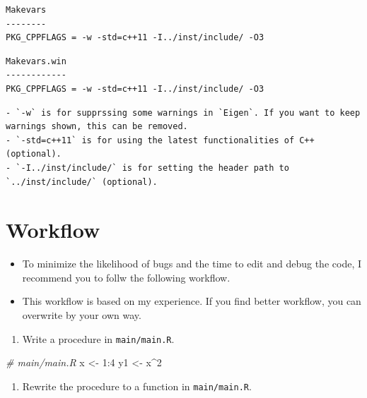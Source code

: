 \documentclass[
]{book}
\newenvironment{Shaded}{\begin{snugshade}}{\end{snugshade}}
\newcommand{\CommentTok}[1]{\textcolor[rgb]{0.56,0.35,0.01}{\textit{#1}}}
\newcommand{\DecValTok}[1]{\textcolor[rgb]{0.00,0.00,0.81}{#1}}
\newcommand{\NormalTok}[1]{#1}
\newcommand{\OtherTok}[1]{\textcolor[rgb]{0.56,0.35,0.01}{#1}}
\newcommand{\SpecialCharTok}[1]{\textcolor[rgb]{0.00,0.00,0.00}{#1}}
\providecommand{\tightlist}{%
  \setlength{\itemsep}{0pt}\setlength{\parskip}{0pt}}
\begin{document}
\begin{verbatim}
Makevars
--------
PKG_CPPFLAGS = -w -std=c++11 -I../inst/include/ -O3
\end{verbatim}

\begin{verbatim}
Makevars.win
------------
PKG_CPPFLAGS = -w -std=c++11 -I../inst/include/ -O3
\end{verbatim}

\begin{verbatim}
- `-w` is for supprssing some warnings in `Eigen`. If you want to keep warnings shown, this can be removed.
- `-std=c++11` is for using the latest functionalities of C++ (optional).
- `-I../inst/include/` is for setting the header path to `../inst/include/` (optional).
\end{verbatim}

\hypertarget{workflow}{%
\section{Workflow}\label{workflow}}

\begin{itemize}
\tightlist
\item
  To minimize the likelihood of bugs and the time to edit and debug the code, I recommend you to follw the following workflow.
\item
  This workflow is based on my experience. If you find better workflow, you can overwrite by your own way.
\end{itemize}

\begin{enumerate}
\def\labelenumi{\arabic{enumi}.}
\tightlist
\item
  Write a procedure in \texttt{main/main.R}.
\end{enumerate}

\begin{Shaded}
\begin{Highlighting}[]
\CommentTok{\# main/main.R}
\NormalTok{x }\OtherTok{\textless{}{-}} \DecValTok{1}\SpecialCharTok{:}\DecValTok{4}
\NormalTok{y1 }\OtherTok{\textless{}{-}}\NormalTok{ x}\SpecialCharTok{\^{}}\DecValTok{2}
\end{Highlighting}
\end{Shaded}

\begin{enumerate}
\def\labelenumi{\arabic{enumi}.}
\setcounter{enumi}{1}
\tightlist
\item
  Rewrite the procedure to a function in \texttt{main/main.R}.
\end{enumerate}
\end{document}
